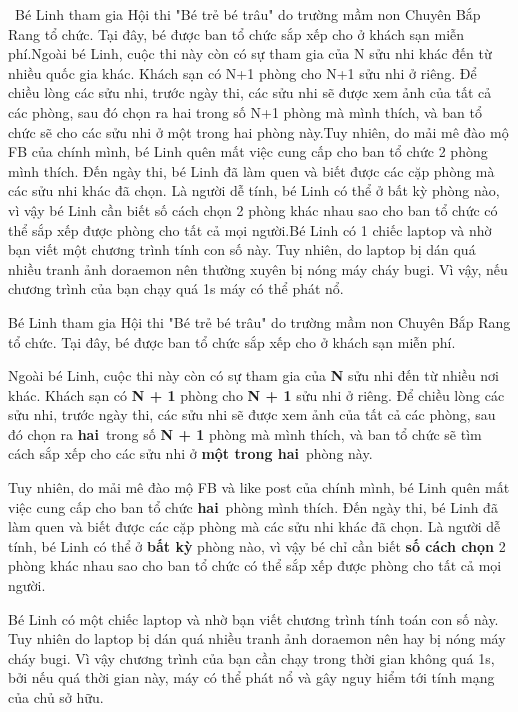 

 Bé Linh tham gia Hội thi "Bé trẻ bé trâu" do trường mầm non Chuyên Bắp Rang tổ chức. Tại đây, bé được ban tổ chức sắp xếp cho ở khách sạn miễn phí.Ngoài bé Linh, cuộc thi này còn có sự tham gia của N sửu nhi khác đến từ nhiều quốc gia khác. Khách sạn có N+1 phòng cho N+1 sửu nhi ở riêng. Để chiều lòng các sửu nhi, trước ngày thi, các sửu nhi sẽ được xem ảnh của tất cả các phòng, sau đó chọn ra hai trong số N+1 phòng mà mình thích, và ban tổ chức sẽ cho các sửu nhi ở một trong hai phòng này.Tuy nhiên, do mải mê đào mộ FB của chính mình, bé Linh quên mất việc cung cấp cho ban tổ chức 2 phòng mình thích. Đến ngày thi, bé Linh đã làm quen và biết được các cặp phòng mà các sửu nhi khác đã chọn. Là người dễ tính, bé Linh có thể ở bất kỳ phòng nào, vì vậy bé Linh cần biết số cách chọn 2 phòng khác nhau sao cho ban tổ chức có thể sắp xếp được phòng cho tất cả mọi người.Bé Linh có 1 chiếc laptop và nhờ bạn viết một chương trình tính con số này. Tuy nhiên, do laptop bị dán quá nhiều tranh ảnh doraemon nên thường xuyên bị nóng máy cháy bugi. Vì vậy, nếu chương trình của bạn chạy quá 1s máy có thể phát nổ.

Bé Linh tham gia Hội thi "Bé trẻ bé trâu" do trường mầm non Chuyên Bắp Rang tổ chức. Tại đây, bé được ban tổ chức sắp xếp cho ở khách sạn miễn phí.

Ngoài bé Linh, cuộc thi này còn có sự tham gia của \textbf{N} sửu nhi đến từ nhiều nơi khác. Khách sạn có \textbf{N + 1} phòng cho \textbf{N + 1} sửu nhi ở riêng. Để chiều lòng các sửu nhi, trước ngày thi, các sửu nhi sẽ được xem ảnh của tất cả các phòng, sau đó chọn ra \textbf{hai} trong số \textbf{N + 1} phòng mà mình thích, và ban tổ chức sẽ tìm cách sắp xếp cho các sửu nhi ở \textbf{một trong hai} phòng này.

Tuy nhiên, do mải mê đào mộ FB và like post của chính mình, bé Linh quên mất việc cung cấp cho ban tổ chức \textbf{hai} phòng mình thích. Đến ngày thi, bé Linh đã làm quen và biết được các cặp phòng mà các sửu nhi khác đã chọn. Là người dễ tính, bé Linh có thể ở \textbf{bất kỳ} phòng nào, vì vậy bé chỉ cần biết \textbf{số cách chọn} 2 phòng khác nhau sao cho ban tổ chức có thể sắp xếp được phòng cho tất cả mọi người.

Bé Linh có một chiếc laptop và nhờ bạn viết chương trình tính toán con số này. Tuy nhiên do laptop bị dán quá nhiều tranh ảnh doraemon nên hay bị nóng máy cháy bugi. Vì vậy chương trình của bạn cần chạy trong thời gian không quá 1s, bởi nếu quá thời gian này, máy có thể phát nổ và gây nguy hiểm tới tính mạng của chủ sở hữu.

